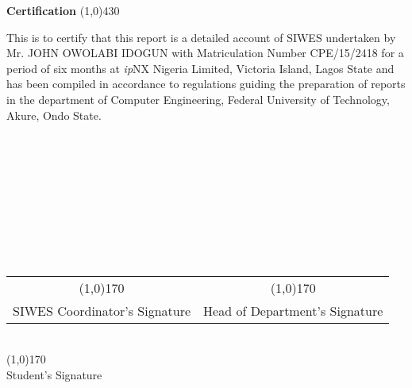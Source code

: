 \begin{center}
{\huge \bf Certification}
\line(1,0){430}
\end{center}



This is to certify that this report is a detailed account of \ac{SIWES} undertaken by Mr. JOHN OWOLABI IDOGUN with Matriculation Number CPE/15/2418 for a period of six months at \textit{ip}NX Nigeria Limited, Victoria Island, Lagos State and has been compiled in accordance to regulations guiding the preparation of reports in the department of Computer Engineering, Federal University of Technology, Akure, Ondo State.\\\\\\\\\\\\\\\\\\\

\begin{center}
	\begin{tabular}{c c}
	 \line(1,0){170} & \hspace{2.5cm} \line(1,0){170}\\
	 SIWES Coordinator's Signature  & \hspace{2.5cm} Head of Department's Signature\\
	\end{tabular}\\
	\vspace{1.0in}
	\line(1,0){170}\\Student's Signature
\end{center}